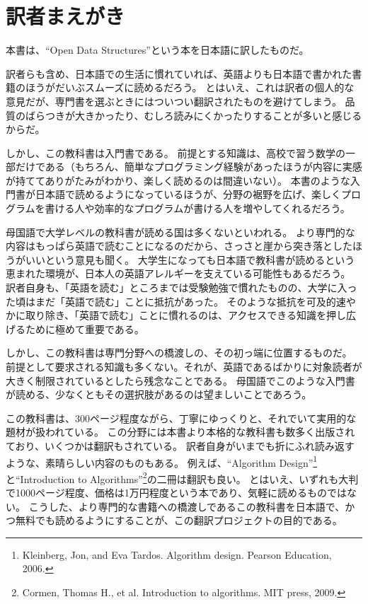 \chapter*{訳者まえがき}

本書は、``Open Data Structures''という本を日本語に訳したものだ。

訳者らも含め、日本語での生活に慣れていれば、英語よりも日本語で書かれた書籍のほうがだいぶスムーズに読めるだろう。
とはいえ、これは訳者の個人的な意見だが、専門書を選ぶときにはついつい翻訳されたものを避けてしまう。
品質のばらつきが大きかったり、むしろ読みにくかったりすることが多いと感じるからだ。

しかし、この教科書は入門書である。
前提とする知識は、高校で習う数学の一部だけである（もちろん、簡単なプログラミング経験があったほうが内容に実感が持ててありがたみがわかり、楽しく読めるのは間違いない）。
本書のような入門書が日本語で読めるようになっているほうが、分野の裾野を広げ、楽しくプログラムを書ける人や効率的なプログラムが書ける人を増やしてくれるだろう。

母国語で大学レベルの教科書が読める国は多くないといわれる。
より専門的な内容はもっぱら英語で読むことになるのだから、さっさと崖から突き落としたほうがいいという意見も聞く。
大学生になっても日本語で教科書が読めるという恵まれた環境が、日本人の英語アレルギーを支えている可能性もあるだろう。
訳者自身も、「英語を読む」ところまでは受験勉強で慣れたものの、大学に入った頃はまだ「英語で読む」ことに抵抗があった。
そのような抵抗を可及的速やかに取り除き、「英語で読む」ことに慣れるのは、アクセスできる知識を押し広げるために極めて重要である。

しかし、この教科書は専門分野への橋渡しの、その初っ端に位置するものだ。
前提として要求される知識も多くない。それが、英語であるばかりに対象読者が大きく制限されているとしたら残念なことである。
母国語でこのような入門書が読める、少なくともその選択肢があるのは望ましいことであろう。

この教科書は、300ページ程度ながら、丁寧にゆっくりと、それでいて実用的な題材が扱われている。
この分野には本書より本格的な教科書も数多く出版されており、いくつかは翻訳もされている。
訳者自身がいまでも折にふれ読み返すような、素晴らしい内容のものもある。
例えば、``Algorithm Design''\footnote{Kleinberg, Jon, and Eva Tardos. Algorithm design. Pearson Education, 2006.}と``Introduction to Algorithms''\footnote{Cormen, Thomas H., et al. Introduction to algorithms. MIT press, 2009.}の二冊は翻訳も良い。
とはいえ、いずれも大判で1000ページ程度、価格は1万円程度という本であり、気軽に読めるものではない。
こうした、より専門的な書籍への橋渡しであるこの教科書を日本語で、かつ無料でも読めるようにすることが、この翻訳プロジェクトの目的である。

